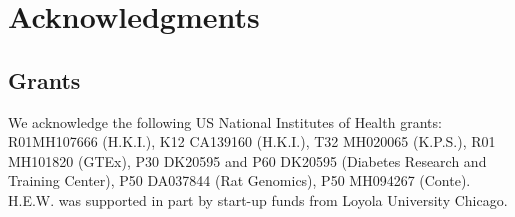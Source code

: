 \documentclass[10pt]{article}
\begin{document}
\section*{Acknowledgments}

\subsection*{Grants}\label{grants}

We acknowledge the following US National Institutes of Health grants:
R01MH107666 (H.K.I.), K12 CA139160 (H.K.I.), T32 MH020065 (K.P.S.), R01 MH101820 (GTEx), 
P30 DK20595 and P60 DK20595 (Diabetes Research and
Training Center), P50 DA037844 (Rat Genomics), P50 MH094267 (Conte). H.E.W. was
supported in part by start-up funds from Loyola University Chicago.





\end{document}
